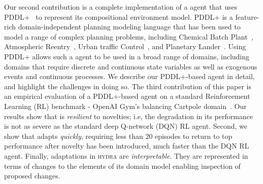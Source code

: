 \documentclass{article}
\begin{document}










Our second contribution is a complete implementation of a \hydra agent that uses PDDL+~\cite{fox2006modelling} to represent its compositional environment model. %
PDDL+ is a feature-rich domain-independent planning modeling language that has been used to model a range of complex planning problems, including Chemical Batch Plant~\cite{della2010pddl+}, Atmospheric Reentry~\cite{piotrowski2018heuristics}, Urban traffic Control~\cite{vallati2016efficient}, and Planetary Lander~\cite{della2010resource}. 
Using PDDL+ allows such a \hydra agent to be used in a broad range of domains, including domains that require discrete and continuous state variables as well as exogenous events and continuous processes. 
We describe our PDDL+-based \hydra agent in detail, and highlight the challenges in doing so. 
The third contribution of this paper is an empirical evaluation of a PDDL+-based \hydra agent on a standard Reinforcement Learning (RL) benchmark - OpenAI Gym's balancing Cartpole domain~\cite{barto1983neuronlike,brockman2016openai}. Our results show that \hydra is \emph{resilient} to novelties; i.e, the degradation in its performance is not as severe as the standard deep Q-network (DQN) RL agent. Second, we show that \hydra adapts \emph{quickly}, requiring less than $20$ episodes to return to top performance after novelty has been introduced, much faster than the DQN RL agent. Finally, adaptations in \textsc{hydra} are \emph{interpretable}. They are represented in terms of changes to the elements of its domain model enabling inspection of proposed changes.

\end{document}
